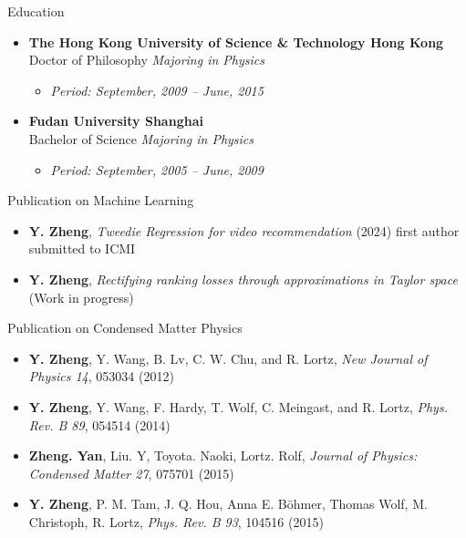 \documentclass[a4paper,8pt,oneside]{scrartcl}
\newenvironment{ressection}[1]{
    \vspace{2pt}
    {\selectfont#1}
    \begin{itemize}
    \vspace{0pt}
}{
    \end{itemize}
}
\newcommand{\resitems}[1]{
    \vspace{-4pt}
    \item #1
}
\newcommand{\ressubitem}[1]{
    \vspace{0pt}
    \item #1
}
\newcommand{\resbigitem}[3]{
    \vspace{-5pt}
    \item
    \textbf{#1}\\
    #2
    \textit{#3}
}
\newenvironment{ressubsec}[3]{
    \resbigitem{#1}{#2}{#3}
    \vspace{-2pt}
    \begin{itemize}
}{
    \end{itemize}
}
\begin{document}
\begin{ressection}{Education}
    \begin{ressubsec}{The Hong Kong University of Science \& Technology \hfill Hong Kong}{Doctor of Philosophy}{Majoring in Physics}
        \ressubitem{\itshape Period: September, 2009 -- June, 2015}
    \end{ressubsec}
    \begin{ressubsec}{Fudan University \hfill Shanghai}{Bachelor of Science}{Majoring in Physics}
        \ressubitem{\itshape Period: September, 2005 -- June, 2009}
    \end{ressubsec}
\end{ressection}

\begin{ressection}{Publication on Machine Learning}
	\resitems{\textbf{Y. Zheng}, \emph{Tweedie Regression for video recommendation} (2024) first author submitted to ICMI}
	\resitems{\textbf{Y. Zheng}, \emph{Rectifying ranking losses through approximations in Taylor space} (Work in progress)}
\end{ressection}

\begin{ressection}{Publication on Condensed Matter Physics}
	  \resitems{\textbf{Y. Zheng}, Y. Wang, B. Lv, C. W. Chu, and R. Lortz, \emph{New Journal of Physics 14}, 053034 (2012)}
	  \resitems{\textbf{Y. Zheng}, Y. Wang, F. Hardy, T. Wolf, C. Meingast, and R. Lortz, \emph{Phys. Rev. B 89}, 054514 (2014)}
	  \resitems{\textbf{Zheng. Yan}, Liu. Y, Toyota. Naoki, Lortz. Rolf, \emph{Journal of Physics: Condensed Matter 27}, 075701 (2015)}
	  \resitems{\textbf{Y. Zheng}, P. M. Tam, J. Q. Hou, Anna E. Böhmer, Thomas Wolf, M. Christoph, R. Lortz, \emph{Phys. Rev. B 93}, 104516 (2015)}
\end{ressection}


\end{document}
